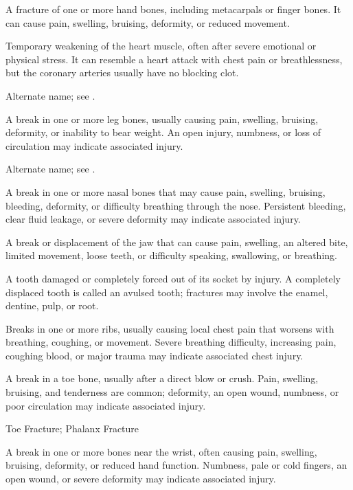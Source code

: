  A fracture of one or more hand bones, including metacarpals or finger bones. It can cause pain, swelling, bruising, deformity, or reduced movement.

 Temporary weakening of the heart muscle, often after severe emotional or physical stress. It can resemble a heart attack with chest pain or breathlessness, but the coronary arteries usually have no blocking clot.

 Alternate name; see .

 A break in one or more leg bones, usually causing pain, swelling, bruising, deformity, or inability to bear weight. An open injury, numbness, or loss of circulation may indicate associated injury.

 Alternate name; see .

 A break in one or more nasal bones that may cause pain, swelling, bruising, bleeding, deformity, or difficulty breathing through the nose. Persistent bleeding, clear fluid leakage, or severe deformity may indicate associated injury.

 A break or displacement of the jaw that can cause pain, swelling, an altered bite, limited movement, loose teeth, or difficulty speaking, swallowing, or breathing.

 A tooth damaged or completely forced out of its socket by injury. A completely displaced tooth is called an avulsed tooth; fractures may involve the enamel, dentine, pulp, or root.

 Breaks in one or more ribs, usually causing local chest pain that worsens with breathing, coughing, or movement. Severe breathing difficulty, increasing pain, coughing blood, or major trauma may indicate associated chest injury.

 A break in a toe bone, usually after a direct blow or crush. Pain, swelling, bruising, and tenderness are common; deformity, an open wound, numbness, or poor circulation may indicate associated injury.

\synonyms
Toe Fracture; Phalanx Fracture

 A break in one or more bones near the wrist, often causing pain, swelling, bruising, deformity, or reduced hand function. Numbness, pale or cold fingers, an open wound, or severe deformity may indicate associated injury.

